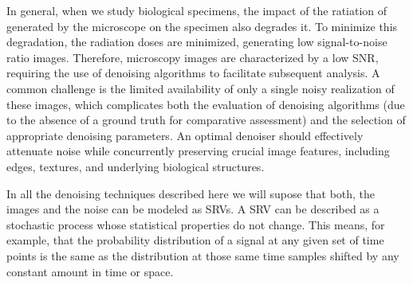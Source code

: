 In general, when we study biological specimens, the impact of the
ratiation of generated by the microscope on the specimen also degrades
it. To minimize this degradation, the radiation doses are minimized,
generating low signal-to-noise ratio images. Therefore, microscopy
images are characterized by a low \gls{SNR}, requiring the use of
denoising algorithms to facilitate subsequent analysis. A common
challenge is the limited availability of only a single noisy
realization of these images, which complicates both the evaluation of
denoising algorithms (due to the absence of a ground truth for
comparative assessment) and the selection of appropriate denoising
parameters. An optimal denoiser should effectively attenuate noise
while concurrently preserving crucial image features, including edges,
textures, and underlying biological structures.

In all the denoising techniques described here we will supose that
both, the images and the noise can be modeled as \gls{SRV}s. A
\gls{SRV} can be described as a stochastic process whose statistical
properties do not change. This means, for example, that the
probability distribution of a signal at any given set of time points
is the same as the distribution at those same time samples shifted by
any constant amount in time or space.



